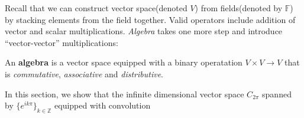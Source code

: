 Recall that we can construct vector space(denoted $V$) from fields(denoted by $\mathbb{F}$) by stacking elements from the field together. Valid operators include addition of vector and scalar multiplications. \textit{Algebra} takes one more step and introduce ``vector-vector'' multiplications:

\begin{definition}[Algebra]An \textbf{algebra} is a vector space equipped with a binary operatation $V\times V\to V$ that is \textit{commutative}, \textit{associative} and \textit{distributive}.

\end{definition}In this section, we show that the infinite dimensional vector space $C_{2\pi}$ spanned by $\{e^{ik\pi}\}_{k\in\mathbb{Z}}$ equipped with convolution